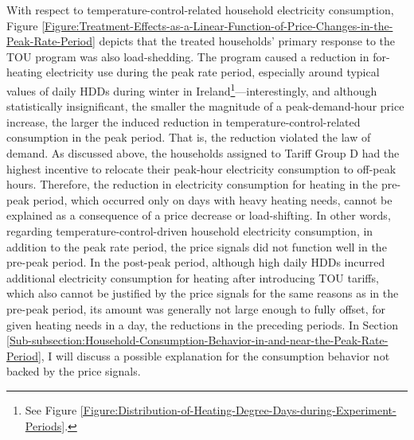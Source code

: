With respect to temperature-control-related household electricity consumption, Figure \ref{Figure:Treatment-Effects-as-a-Linear-Function-of-Price-Changes-in-the-Peak-Rate-Period} depicts that the treated households' primary response to the TOU program was also load-shedding. The program caused a reduction in for-heating electricity use during the peak rate period, especially around typical values of daily HDDs during winter in Ireland\footnote{See Figure \ref{Figure:Distribution-of-Heating-Degree-Days-during-Experiment-Periods}.}---interestingly, and although statistically insignificant, the smaller the magnitude of a peak-demand-hour price increase, the larger the induced reduction in temperature-control-related consumption in the peak period. That is, the reduction violated the law of demand. As discussed above, the households assigned to Tariff Group D had the highest incentive to relocate their peak-hour electricity consumption to off-peak hours. Therefore, the reduction in electricity consumption for heating in the pre-peak period, which occurred only on days with heavy heating needs, cannot be explained as a consequence of a price decrease or load-shifting. In other words, regarding temperature-control-driven household electricity consumption, in addition to the peak rate period, the price signals did not function well in the pre-peak period. In the post-peak period, although high daily HDDs incurred additional electricity consumption for heating after introducing TOU tariffs, which also cannot be justified by the price signals for the same reasons as in the pre-peak period, its amount was generally not large enough to fully offset, for given heating needs in a day, the reductions in the preceding periods. In Section \ref{Sub-subsection:Household-Consumption-Behavior-in-and-near-the-Peak-Rate-Period}, I will discuss a possible explanation for the consumption behavior not backed by the price signals.  

